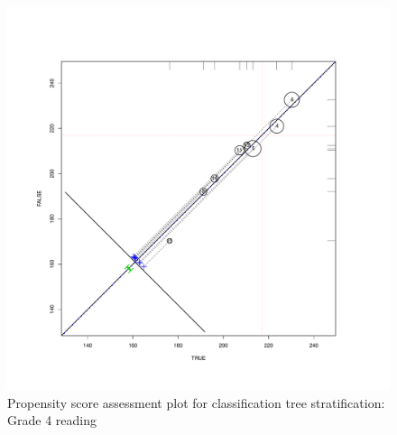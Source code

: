\begin{figure}
\begin{center}
\includegraphics[height=.4\textheight,width=.4\textheight]{../Figures2009/g4read-circpsa-tree.pdf}
\caption{Propensity score assessment plot for classification tree stratification: Grade 4 reading}
\end{center}
\end{figure}



